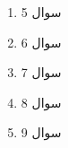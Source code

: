 \begin{enumerate}
	\item  سوال 5
	
	\item  سوال 6
	
	\item  سوال 7
	
	\item  سوال 8
	
	\item  سوال 9

	
	
\end{enumerate}
